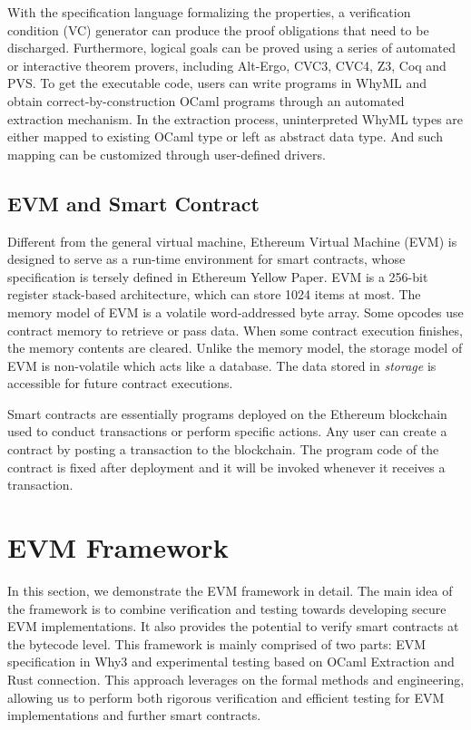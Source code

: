 \documentclass[runningheads]{llncs}
\begin{document}
With the specification language formalizing the properties, a verification condition (VC) generator can produce the proof obligations that need to be discharged. Furthermore, logical goals can be proved using a series of automated or interactive theorem provers, including Alt-Ergo, CVC3, CVC4, Z3, Coq and PVS. To get the executable code, users can write programs in WhyML and obtain correct-by-construction OCaml programs through an automated extraction mechanism. In the extraction process, uninterpreted WhyML types are either mapped to existing OCaml type or left as abstract data type. And such mapping can be customized through user-defined drivers. 
\subsection{EVM and Smart Contract}
Different from the general virtual machine, Ethereum Virtual Machine (EVM) is designed to serve as a run-time environment for smart contracts, whose specification is tersely defined in Ethereum Yellow Paper\cite{wood2014ethereum}.
EVM is a 256-bit register stack-based architecture, which can store 1024 items at most. The memory model of EVM is a volatile word-addressed byte array. Some opcodes use contract memory to retrieve or pass data. When some contract execution finishes, the memory contents are cleared. Unlike the memory model, the storage model of EVM is non-volatile which acts like a database. The data stored in \textit{storage} is accessible for future contract executions.

Smart contracts are essentially programs deployed on the Ethereum blockchain used to conduct transactions or perform specific actions. Any user can create a contract by posting a transaction to the blockchain. The program code of the contract is fixed after deployment and it will be invoked whenever it receives a transaction. 

\section{EVM Framework}\label{Sec: Framework}
In this section, we demonstrate the EVM framework in detail. The main idea of the framework is to combine verification and testing towards developing secure EVM implementations.
It also provides the potential to verify smart contracts at the bytecode level.  This framework is mainly comprised of two parts: EVM specification in Why3 and experimental testing based on OCaml Extraction and Rust connection. This approach leverages on the formal methods and engineering, allowing us to perform both rigorous verification and efficient testing for EVM implementations and further smart contracts. 
\end{document}
